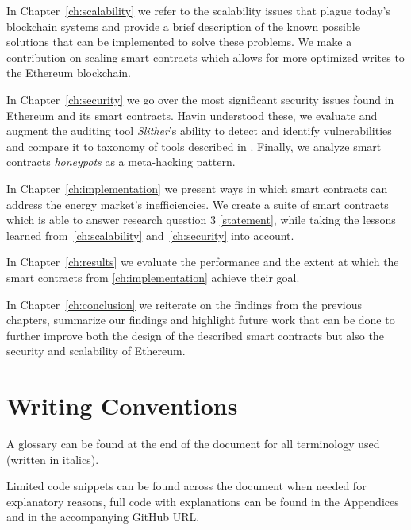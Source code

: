 In Chapter~\ref{ch:scalability} we refer to the scalability issues that plague today's blockchain systems and provide a brief description of the known possible solutions that can be implemented to solve these problems. We make a contribution on scaling smart contracts which allows for more optimized writes to the Ethereum blockchain.

In Chapter~\ref{ch:security} we go over the most significant security issues found in Ethereum and its smart contracts. Havin understood these, we evaluate and augment the auditing tool \textit{Slither}'s ability to detect and identify vulnerabilities and compare it to taxonomy of tools described in \cite{tools}. Finally, we analyze smart contracts \textit{honeypots} as a meta-hacking pattern. %

In Chapter~\ref{ch:implementation} we present ways in which smart contracts can address the energy market's inefficiencies. We create a suite of smart contracts which is able to answer research question 3 \ref{statement}, while taking the lessons learned from~\ref{ch:scalability} and~\ref{ch:security} into account.

In Chapter~\ref{ch:results} we evaluate the performance and the extent at which the smart contracts from \ref{ch:implementation} achieve their goal. 

In Chapter~\ref{ch:conclusion} we reiterate on the findings from the previous chapters, summarize our findings and highlight future work that can be done to further improve both the design of the described smart contracts but also the security and scalability of Ethereum.

\section{Writing Conventions}
A glossary can be found at the end of the document for all terminology used (written in italics). 

Limited code snippets can be found across the document when needed for explanatory reasons, full code with explanations can be found in the Appendices and in the accompanying GitHub URL\@. 